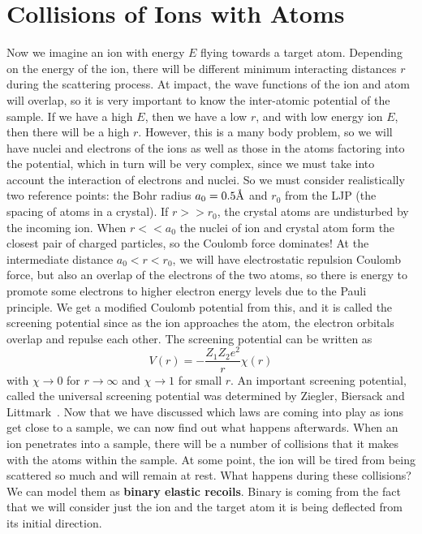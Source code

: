 \section{Collisions of Ions with Atoms}\label{sec:collisions-of-ions-with-atoms}
Now we imagine an ion with energy $E$ flying towards a target atom.
Depending on the energy of the ion, there will be different minimum interacting distances $r$ during the scattering process.
At impact, the wave functions of the ion and atom will overlap, so it is very important to know the inter-atomic potential of the sample.
If we have a high $E$, then we have a low $r$, and with low energy ion $E$, then there will be a high $r$.
However, this is a many body problem, so we will have nuclei and electrons of the ions as well as those in the atoms factoring into the potential, which in turn will be very complex, since we must take into account the interaction of electrons and nuclei.
So we must consider realistically two reference points: the Bohr radius $a_0 = 0.5\textup{\AA}$ and $r_0$ from the LJP (the spacing of atoms in a crystal).
If $r >> r_0$, the crystal atoms are undisturbed by the incoming ion.
When $r << a_0$ the nuclei of ion and crystal atom form the closest pair of charged particles, so the Coulomb force dominates!
At the intermediate distance $a_0 < r < r_0$, we will have electrostatic repulsion Coulomb force, but also an overlap of the electrons of the two atoms, so there is energy to promote some electrons to higher electron energy levels due to the Pauli principle.
We get a modified Coulomb potential from this, and it is called the screening potential since as the ion approaches the atom, the electron orbitals overlap and repulse each other.
The screening potential can be written as $$ V(r) = -\frac{Z_1 Z_2 e^2}{r} \chi(r)$$ with $\chi \rightarrow 0$ for $r \rightarrow \infty$ and $\chi \rightarrow 1$ for small $r$.
An important screening potential, called the universal screening potential was determined by Ziegler, Biersack and Littmark~\cite{3}.
Now that we have discussed which laws are coming into play as ions get close to a sample, we can now find out what happens afterwards.
When an ion penetrates into a sample, there will be a number of collisions that it makes with the atoms within the sample.
At some point, the ion will be tired from being scattered so much and will remain at rest.
What happens during these collisions?
We can model them as \textbf{binary elastic recoils}.
Binary is coming from the fact that we will consider just the ion and the target atom it is being deflected from its initial direction.
